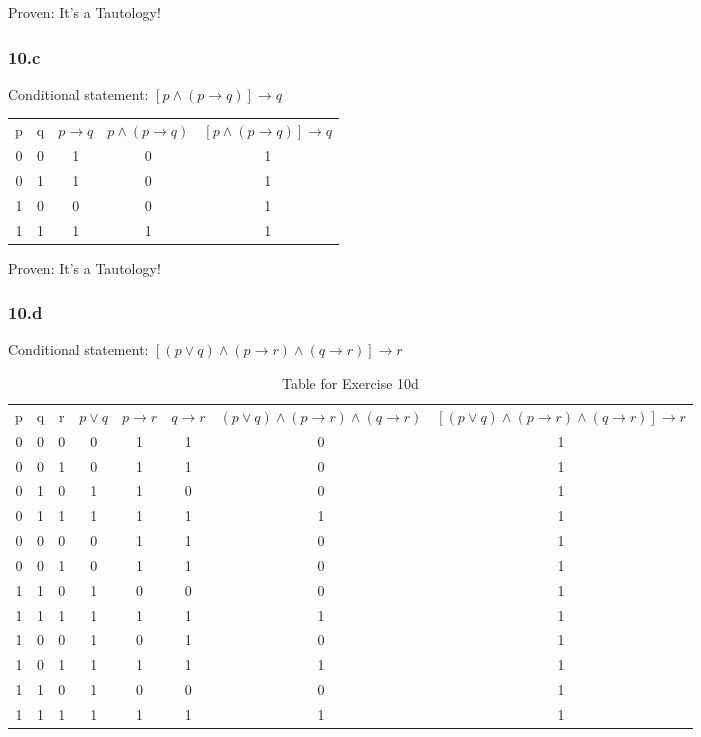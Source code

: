 \documentclass[12pt]{article}
\begin{document}
Proven: It's a Tautology!

\subsubsection{10.c}
Conditional statement: $[p \wedge (p\rightarrow q)] \rightarrow q$

\begin{table}[tbh]
  \begin{tabular}{ccccc}
    p & q& $p\rightarrow q$&$p\wedge(p\rightarrow q)$&$[p\wedge(p\rightarrow q)]\rightarrow q$\\
    0& 0& 1& 0& 1\\
    0& 1& 1& 0& 1\\
    1& 0& 0& 0& 1\\
    1& 1& 1& 1& 1
  \end{tabular}
\end{table}

Proven: It's a Tautology!

\subsubsection{10.d}
Conditional statement: $[(p\vee q) \wedge (p\rightarrow r) \wedge (q\rightarrow r)] \rightarrow r$

\begin{table}[p]
  \begin{tabular}{cccccccc}
    p& q& r& $p\vee q$& $p\rightarrow r$& $q\rightarrow r$& $(p\vee q) \wedge (p\rightarrow r) \wedge (q\rightarrow r)$&$[(p\vee q) \wedge (p\rightarrow r) \wedge (q\rightarrow r)] \rightarrow r $ \\
    0& 0& 0& 0& 1& 1 &0 &1 \\
    0& 0& 1& 0& 1& 1 &0 &1 \\
    0& 1& 0& 1& 1& 0 &0 &1 \\
    0& 1& 1& 1& 1& 1 &1 &1 \\
    0& 0& 0& 0& 1& 1 &0 &1 \\
    0& 0& 1& 0& 1& 1 &0 &1 \\
    1& 1& 0& 1& 0& 0 &0 &1 \\
    1& 1& 1& 1& 1& 1 &1 &1 \\
    1& 0& 0& 1& 0& 1 &0 &1 \\
    1& 0& 1& 1& 1& 1 &1 &1 \\
    1& 1& 0& 1& 0& 0 &0 &1 \\
    1& 1& 1& 1& 1& 1 &1 &1
  \end{tabular}
  \caption{Table for Exercise 10d}
  \label{table:10d}
\end{table}
\end{document}
